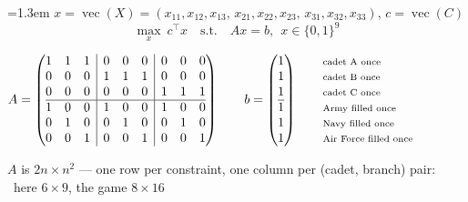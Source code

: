 \documentclass[10pt]{article}
\newenvironment{board}{%
  \par\vspace{2pt}
  \begingroup\leftskip=1.3em\relax}{%
  \par\endgroup\vspace{2pt}}
\begin{document}
\begin{board}
\quad $x = \operatorname{vec}(X) = (x_{11}, x_{12}, x_{13}, \, x_{21}, x_{22}, x_{23}, \, x_{31}, x_{32}, x_{33})$, \quad $c = \operatorname{vec}(C)$
\[
  \max_x \ c^{\top}x \quad \text{s.t.} \quad Ax = b, \ \ x \in \{0,1\}^{9}
\]
\begin{center}\small
\setlength{\arraycolsep}{2.6pt}\renewcommand{\arraystretch}{0.92}%
$A = \left(\begin{array}{@{}ccc|ccc|ccc@{}}
 1&1&1 & 0&0&0 & 0&0&0 \\
 0&0&0 & 1&1&1 & 0&0&0 \\
 0&0&0 & 0&0&0 & 1&1&1 \\ \hline
 1&0&0 & 1&0&0 & 1&0&0 \\
 0&1&0 & 0&1&0 & 0&1&0 \\
 0&0&1 & 0&0&1 & 0&0&1
\end{array}\right)
\qquad
b = \left(\begin{array}{@{}c@{}} 1\\ 1\\ 1\\ \hline 1\\ 1\\ 1 \end{array}\right)
\qquad
\begin{array}{@{}l@{}}
 \text{\scriptsize cadet A once} \\ \text{\scriptsize cadet B once} \\ \text{\scriptsize cadet C once} \\ \noalign{\vskip\arrayrulewidth}
 \text{\scriptsize Army filled once} \\ \text{\scriptsize Navy filled once} \\ \text{\scriptsize Air Force filled once}
\end{array}$
\end{center}
\quad $A$ is $2n \times n^2$ --- one row per constraint, one column per (cadet, branch) pair: \ here $6 \times 9$, the game $8 \times 16$
\end{board}
\end{document}
